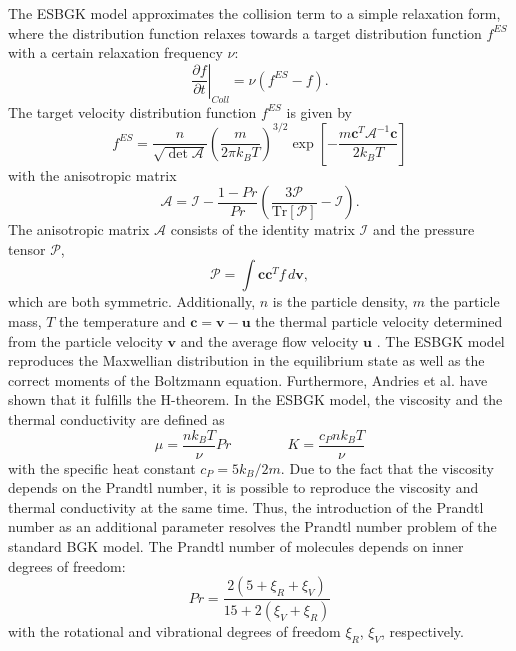 \documentclass[aip,pof,amsmath,amssymb,preprint]{revtex4-1}
\begin{document}
The ESBGK model approximates the collision term to a simple relaxation form, where the distribution function relaxes towards a target distribution function $f^{ES}$ with a 
certain relaxation frequency $\nu$:
\begin{equation}
\left.\frac{\partial f}{\partial t}\right|_{Coll}=\nu\left(f^{ES}-f\right).
\label{eq:bgkmain}
\end{equation}
The target velocity distribution function $f^{ES}$ is given by 
\begin{equation}
f^{ES}=\frac{n}{\sqrt{\det \mathcal A}} \left(\frac{m}{2\pi k_B T}\right)^{3/2} \exp\left[-\frac{m\mathbf c^T \mathcal A^{-1} \mathbf c}{2k_B T}\right]
\label{eq:esbgkdist}
\end{equation}  
with the anisotropic matrix 
\begin{equation}
\mathcal A = \mathcal I - \frac{1-Pr}{Pr}\left(\frac{3\mathcal P}{\mathrm{Tr}\left[\mathcal P\right]}-\mathcal I\right).
\end{equation}
The anisotropic matrix $\mathcal A$ consists of the identity matrix $\mathcal I$ and the pressure tensor $\mathcal P$,
\begin{equation}
\mathcal P = \int \mathbf c \mathbf c^T f\,d\mathbf v,
\end{equation}
which are both symmetric. 
Additionally, $n$ is the particle density, $m$ the particle mass, $T$ the temperature and $\mathbf c=\mathbf v -\mathbf u$  the thermal particle velocity determined from the 
particle velocity $\mathbf v$ and the average flow velocity $\mathbf u$ \cite{bhatnagar1954model}. 
The ESBGK model reproduces the Maxwellian distribution in the equilibrium state as well as the correct moments
of the Boltzmann equation. Furthermore, Andries et al.\cite{andries2000gaussian,andries2001bgk} have shown that it
fulfills the H-theorem. In the ESBGK model, the viscosity and the thermal conductivity are defined as 
\begin{equation}
\mu=\frac{nk_BT}{\nu}Pr \qquad\qquad K=\frac{c_Pnk_BT}{\nu}
\end{equation}
with the specific heat constant 
$c_P=5k_B/2m$.
Due to the fact that the viscosity depends on the Prandtl number, it is possible to reproduce the viscosity and thermal
conductivity at the same time. Thus, the introduction of the Prandtl number as an additional parameter resolves the Prandtl number
problem of the standard BGK model.
The Prandtl number
of molecules depends on inner degrees of freedom:
\begin{equation} 
Pr = \frac{2(5+\xi_R+\xi_V)}{15+2(\xi_V+\xi_R)}
\end{equation}
with the rotational and vibrational degrees of freedom $\xi_R$, $\xi_V$, respectively. 
\end{document}
